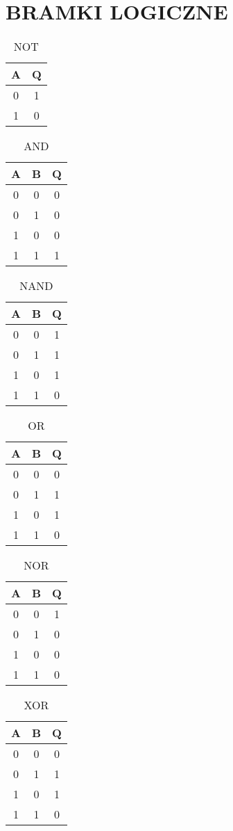 \documentclass[12pt, letterpaper, titlepage]{article}
\begin{document}
\section{BRAMKI LOGICZNE}
\begin{table}[h]
\centering\caption{NOT}
\begin{tabular}{| c | c |}
	\hline
	A & Q\\
	\hline
	0 & 1\\
	1 & 0\\
	\hline
\end{tabular}
\end{table}
\begin{table}[h]
\centering\caption{AND}
\begin{tabular}{| c c | c |}
	\hline
	A & B & Q\\
	\hline
	0 & 0 & 0\\
	0 & 1 & 0\\
	1 & 0 & 0\\
	1 & 1 & 1\\
	\hline
\end{tabular}
\end{table}
\begin{table}[h]
\centering\caption{NAND}
\begin{tabular}{| c c | c |}
	\hline
	A & B & Q\\
	\hline
	0 & 0 & 1\\
	0 & 1 & 1\\
	1 & 0 & 1\\
	1 & 1 & 0\\
	\hline
\end{tabular}
\end{table}
\begin{table}[h]
\centering\caption{OR}
\begin{tabular}{| c c | c |}
	\hline
	A & B & Q\\
	\hline
	0 & 0 & 0\\
	0 & 1 & 1\\
	1 & 0 & 1\\
	1 & 1 & 0\\
	\hline
\end{tabular}
\end{table}
\begin{table}[h]
\centering\caption{NOR}
\begin{tabular}{| c c | c |}
	\hline
	A & B & Q\\
	\hline
	0 & 0 & 1\\
	0 & 1 & 0\\
	1 & 0 & 0\\
	1 & 1 & 0\\
	\hline
\end{tabular}
\end{table}
\begin{table}[h]
\centering\caption{XOR}
\begin{tabular}{| c c | c |}
	\hline
	A & B & Q\\
	\hline
	0 & 0 & 0\\
	0 & 1 & 1\\
	1 & 0 & 1\\
	1 & 1 & 0\\
	\hline
\end{tabular}
\end{table}
\end{document}
